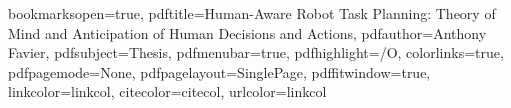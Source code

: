 \usepackage{color}

\hypersetup
{
bookmarksopen=true,
pdftitle=Human-Aware Robot Task Planning: Theory of Mind and Anticipation of Human Decisions and Actions,
pdfauthor=Anthony Favier, %
pdfsubject=Thesis, %
pdfmenubar=true, %
pdfhighlight=/O, %
colorlinks=true, %
pdfpagemode=None, %
pdfpagelayout=SinglePage, %
pdffitwindow=true, %
linkcolor=linkcol, %
citecolor=citecol, %
urlcolor=linkcol %
}


\setcounter{secnumdepth}{3}
\setcounter{tocdepth}{2}


\newcommand{\pd}[2]{\frac{\partial #1}{\partial #2}}
\def\abs{\operatorname{abs}}
\def\argmax{\operatornamewithlimits{arg\,max}}
\def\argmin{\operatornamewithlimits{arg\,min}}
\def\diag{\operatorname{Diag}}
\newcommand{\eqRef}[1]{(\ref{#1})}

\usepackage[figuresleft]{rotating}                    %


\usepackage{fancyhdr}                    %

\pagestyle{fancy}                       %
\fancyfoot{}                            %

